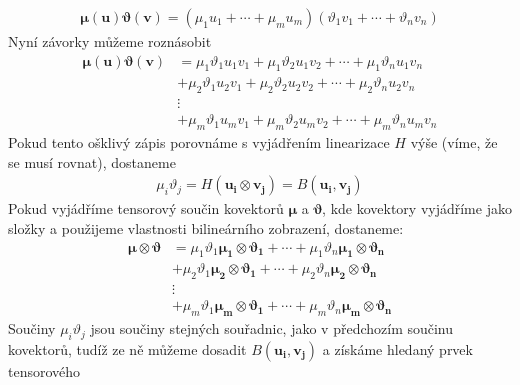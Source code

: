 \documentclass[a5paper,12pt]{amsbook}
\theoremstyle{definition}
\newcommand{\myvec}[1]{\bm{#1}}
\begin{document}
\begin{equation*}
\begin{split}
\myvec{\mu}(\myvec{u})\myvec{\vartheta}(\myvec{v}) =
  \left(\mu_1 u_1 + \cdots + \mu_m u_m \right)
  \left(\vartheta_1 v_1 + \cdots + \vartheta_n v_n \right)
\end{split}
\end{equation*}
Nyní závorky můžeme roznásobit
\begin{equation*}
\begin{split}
\myvec{\mu}(\myvec{u})\myvec{\vartheta}(\myvec{v}) &=
  \mu_1\vartheta_1 u_1 v_1 + \mu_1\vartheta_2 u_1 v_2 + \cdots + \mu_1\vartheta_n u_1 v_n \\
  &+ \mu_2\vartheta_1 u_2 v_1 + \mu_2\vartheta_2 u_2 v_2 + \cdots + \mu_2\vartheta_n u_2 v_n\\
  &\vdots \\
  &+ \mu_m\vartheta_1 u_m v_1 + \mu_m\vartheta_2 u_m v_2 + \cdots + \mu_m\vartheta_n u_m v_n
\end{split}
\end{equation*}
Pokud tento ošklivý zápis porovnáme s vyjádřením linearizace $H$ výše (víme, že se musí rovnat),
dostaneme
\begin{equation*}
\begin{split}
\mu_i\vartheta_j = H(\myvec{u_i}\otimes\myvec{v_j}) = B(\myvec{u_i}, \myvec{v_j})
\end{split}
\end{equation*}
Pokud vyjádříme tensorový součin kovektorů $\myvec{\mu}$ a $\myvec{\vartheta}$, kde
kovektory vyjádříme jako složky a použijeme vlastnosti bilineárního zobrazení, dostaneme:
\begin{equation*}
\begin{split}
\myvec{\mu}\otimes\myvec{\vartheta} &=
  \mu_1\vartheta_1\myvec{\mu_1}\otimes\myvec{\vartheta_1} + \cdots 
    + \mu_1\vartheta_n\myvec{\mu_1}\otimes\myvec{\vartheta_n} \\
  & + \mu_2\vartheta_1\myvec{\mu_2}\otimes\myvec{\vartheta_1} + \cdots 
    + \mu_2\vartheta_n\myvec{\mu_2}\otimes\myvec{\vartheta_n} \\
  &\vdots \\
  & + \mu_m\vartheta_1\myvec{\mu_m}\otimes\myvec{\vartheta_1} + \cdots 
    + \mu_m\vartheta_n\myvec{\mu_m}\otimes\myvec{\vartheta_n}
\end{split}
\end{equation*}
Součiny $\mu_i\vartheta_j$ jsou součiny stejných souřadnic, jako v předchozím součinu kovektorů,
tudíž ze ně můžeme dosadit $B(\myvec{u_i}, \myvec{v_j})$ a získáme hledaný prvek tensorového
\end{document}
